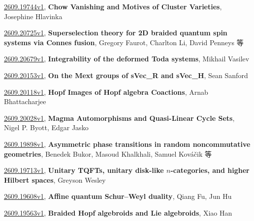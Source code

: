 \documentclass[9pt, a4paper]{article}
\theoremstyle{plain}
\theoremstyle{definition}
\theoremstyle{remark}
\newcommand{\arxiv}[3]{\href{https://arxiv.org/abs/#1}{#1}, \textbf{\textcolor{arxivblue}{#2}}, #3}
\begin{document}
\arxiv{2609.19744v1}{Chow Vanishing and Motives of Cluster Varieties}{Josephine Hlavinka}

\arxiv{2609.20725v1}{Superselection theory for 2D braided quantum spin systems via Connes fusion}{Gregory Faurot, Charlton Li, David Penneys 等}

\arxiv{2609.20679v1}{Integrability of the deformed Toda systems}{Mikhail Vasilev}

\arxiv{2609.20153v1}{On the Mext groups of sVec_R and sVec_H}{Sean Sanford}

\arxiv{2609.20118v1}{Hopf Images of Hopf algebra Coactions}{Arnab Bhattacharjee}

\arxiv{2609.20028v1}{Magma Automorphisms and Quasi-Linear Cycle Sets}{Nigel P. Byott, Edgar Jasko}

\arxiv{2609.19898v1}{Asymmetric phase transitions in random noncommutative geometries}{Benedek Bukor, Masoud Khalkhali, Samuel Kováčik 等}

\arxiv{2609.19713v1}{Unitary TQFTs, unitary disk-like $n$-categories, and higher Hilbert spaces}{Greyson Wesley}

\arxiv{2609.19608v1}{Affine quantum Schur--Weyl duality}{Qiang Fu, Jun Hu}

\arxiv{2609.19563v1}{Braided Hopf algebroids and Lie algebroids}{Xiao Han}

\end{document}
